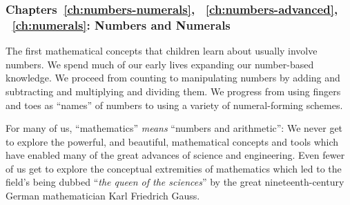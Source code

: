 \subsubsection{Chapters~\ref{ch:numbers-numerals},
~\ref{ch:numbers-advanced}, ~\ref{ch:numerals}: Numbers and Numerals}

The first mathematical concepts that children learn about usually involve numbers.  We spend much of our early lives expanding our number-based knowledge.  We proceed from counting to manipulating numbers by adding and subtracting and multiplying and dividing them.  We progress from using fingers and toes as ``names'' of numbers to using a variety of numeral-forming schemes.

\smallskip

For many of us, ``mathematics'' {\em means} ``numbers and arithmetic'': We never get to explore the powerful, and beautiful, mathematical concepts and tools which have enabled many of the great advances of science and engineering.  Even fewer of us get to explore the conceptual extremities of mathematics which led to the field's being dubbed ``{\em the queen of the  sciences}'' by the great nineteenth-century German mathematician Karl Friedrich Gauss. 


\smallskip


